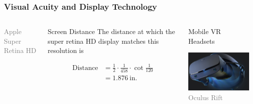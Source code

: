 \documentclass[10pt]{beamer}
\begin{document}
\begin{frame}
\frametitle{Visual Acuity and Display Technology}
\begin{columns}
  \begin{center}
  
  \newline
  {\tiny \textcolor{gray}{Apple Super Retina HD}}
  \end{center}
\begin{block}{Screen Distance}
  The distance at which the super retina HD display matches this resolution is
  \begin{small}
  \begin{equation*}
  \begin{split}
  \text{Distance} &= \frac{1}{2} \cdot \frac{1}{458} \cdot \cot \frac{1}{120} \\
  &= 1.876~\text{in} .
  \end{split}
  \end{equation*}
  \end{small}
\end{block}
\begin{block}{Mobile VR Headsets}
  \begin{center}
  \includegraphics[width=2in]{Figures/Visual-Oculus.jpg}
  \newline
  {\tiny \textcolor{gray}{\textcopyright Oculus Rift}}
  \end{center}
  \end{block}
\end{columns}
\end{frame}
\end{document}
